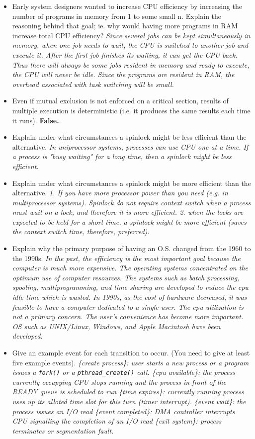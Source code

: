 \documentclass[10pt,landscape]{article}
\begin{document}
\begin{multicols}{4}
\begin{itemize}
    \item Early system designers wanted to increase CPU efficiency by increasing the number of programs in memory from 1 to some small n.  Explain the reasoning behind that goal; ie. why would having more programs in RAM increase total CPU efficiency?  \textit{Since several jobs can be kept simultaneously in memory, when one job needs to wait, the CPU is switched to another job and execute it. After the first job finishes its waiting, it can get the CPU back. Thus there will always be some jobs resident in memory and ready to execute, the CPU will never be idle. Since the programs are resident in RAM, the overhead associated with task switching will be small.}
    \item Even if mutual exclusion is not enforced on a critical section, results of multiple execution is deterministic (i.e. it produces the same results each time it runs). \textbf{False.}.
    \item Explain under what circumstances a spinlock might be less efficient than the alternative.  \textit{In uniprocessor systems, processes can use CPU one at a time.  If a process is "busy waiting" for a long time, then a spinlock might be less efficient.}
    \item Explain under what circumstances a spinlock might be more efficient than the alternative.  \textit{1. If you have more processor power than you need (e.g. in multiprocessor systems). Spinlock do not require context switch when a process must wait on a lock, and therefore it is more efficient.  2. when the locks are expected to be held for a short time, a spinlock might be more efficient (saves the context switch time, therefore, preferred).}
    \item Explain why the primary purpose of having an O.S. changed from the 1960 to the 1990s.  \textit{In the past, the efficiency is the most important goal because the computer is much more expensive. The operating systems concentrated on the optimum use of computer resources. The systems such as batch processing, spooling, multiprogramming, and time sharing are developed to reduce the cpu idle time which is wasted. In 1990s, as the cost of hardware decreased, it was feasible to have a computer dedicated to a single user. The cpu utilization is not a primary concern. The user's convenience has become more important. OS such as UNIX/Linux, Windows, and Apple Macintosh have been developed.}
    \item Give an example event for each transition to occur. (You need to give at least five example events). \textit{\{create process\}: user starts a new process or a program issues a \texttt{fork()} or a \texttt{pthread\_create()} call. \{cpu available\}: the process currently occupying CPU stops running and the process in front of the READY queue is scheduled to run \{time expires\}: currently running process uses up its alloted time slot for this turn (timer interrupt). \{event wait\}: the process issues an I/O read \{event completed\}: DMA controller interrupts CPU signalling the completion of an I/O read \{exit system\}: process terminates or segmentation fault.}


\end{itemize}
\end{multicols}
\end{document}
